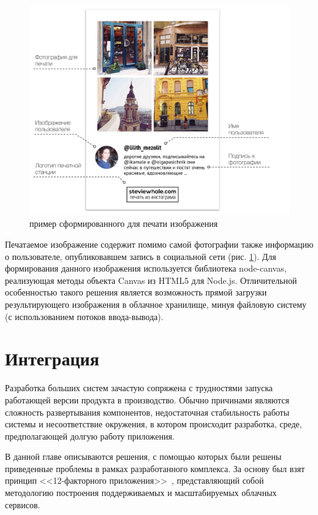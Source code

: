 \documentclass[a4paper,14pt,href,draft]{article}
\begin{document}
\begin{figure}[t!]
\begin{center}
  \includegraphics[scale=0.6]{photo-layout.pdf}
    \caption{пример сформированного для печати изображения}
    \label{fig:PhotoLayout}
\end{center}
\end{figure}

Печатаемое изображение содержит помимо самой фотографии также информацию о пользователе, опубликовавшем запись
в социальной сети (рис. \ref{fig:PhotoLayout}). Для формирования данного изображения используется библиотека node-canvas,
реализующая методы объекта Canvas из HTML5  для Node.js. Отличительной особенностью такого решения является
возможность прямой загрузки результирующего изображения в облачное хранилище, минуя файловую систему (с использованием
потоков ввода-вывода).

\newpage
\section{Интеграция}
Разработка больших систем зачастую сопряжена с трудностями запуска работающей версии продукта в производство.
Обычно причинами являются
 сложность развертывания компонентов, недостаточная стабильность работы системы и несоответствие окружения, в
котором происходит разработка, среде, предполагающей долгую работу приложения.

В данной главе описываются решения, с помощью которых были решены приведенные проблемы в рамках разработанного
комплекса. За основу был взят принцип <<12-факторного приложения>>~\cite{TwelveFactor}, представляющий собой методологию
построения поддерживаемых и масштабируемых облачных сервисов.
\end{document}
